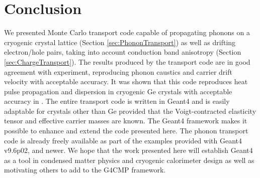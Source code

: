 \documentclass[preprint,12pt]{elsarticle}
\begin{document}


\section{Conclusion}
\label{sec:Conclusion}

 
 
We presented Monte Carlo transport code capable of propagating phonons on a cryogenic crystal lattice (Section \ref{sec:PhononTransport}) as well as drifting electron/hole pairs, taking into account conduction band anisotropy (Section \ref{sec:ChargeTransport}). The results produced by the transport code are in good agreement with experiment, reproducing phonon caustics and carrier drift velocity with acceptable accuracy. It was shown that this code reproduces heat pulse propagation and dispersion in cryogenic Ge crystals with acceptable accuracy in \cite{Brandt}. The entire transport code is written in Geant4 and is easily adaptable for crystals other than Ge provided that the Voigt-contracted elasticity tensor and effective carrier masses are known. The Geant4 framework makes it possible to enhance and extend the code presented here. The phonon transport code is already freely available as part of the examples provided with  Geant4 v9.6p02, and newer. 
We hope that the work presented here will establish Geant4 as a tool in condensed matter physics and cryogenic calorimeter design as well as motivating others to add to the G4CMP framework.



\end{document}

